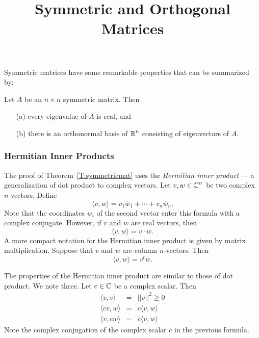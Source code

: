 \documentclass{ximera}
\title{Symmetric and Orthogonal Matrices}
\begin{document}
\begin{abstract}
\end{abstract}
\maketitle


\label{S:symmetric}

Symmetric matrices have some remarkable properties that can be
summarized by:
\begin{theorem}  \label{T:symmetricmat}
Let $A$ be an $n\times n$ symmetric matrix.
Then
\begin{enumerate}
\item[(a)] every eigenvalue
of $A$ is real, and
\item[(b)] there is an orthonormal basis
of $\mbox{$\Bbb{R}$}^n$ consisting of
	eigenvectors of $A$.
\end{enumerate}
\end{theorem}

\subsubsection*{Hermitian Inner Products}

The proof of Theorem~\ref{T:symmetricmat} uses the {\em Hermitian inner
product} --- a generalization of
dot product to complex vectors.
Let $v,w\in\mbox{$\Bbb{C}$}^n$ be two complex $n$-vectors.  Define
\[
\langle v,w \rangle = v_1\overline{w}_1 + \cdots + v_n\overline{w}_n.
\]
Note that the coordinates $w_i$ of the second vector enter this formula
with a complex conjugate.  However, if $v$ and $w$ are real vectors, then
\[
\langle v,w \rangle = v\cdot w.
\]
A more compact notation for the Hermitian inner product is given by
matrix multiplication.
Suppose that $v$ and $w$ are column $n$-vectors.
Then
\[
\langle v,w \rangle = v^t\overline{w}.
\]

The properties of the Hermitian inner product are similar to those of dot
product.  We note three.  Let $c\in\mbox{$\Bbb{C}$}$ be a complex scalar.  Then
\begin{eqnarray*}
\langle v,v \rangle & = & ||v||^2\ge 0\\
\langle cv,w \rangle & = & c\langle v,w \rangle \\
\langle v,cw \rangle & = & \overline{c} \langle v,w \rangle
\end{eqnarray*}
Note the complex conjugation of the complex scalar $c$ in the previous
formula.
\end{document}
